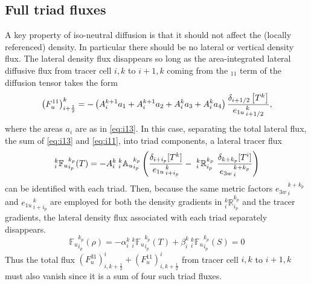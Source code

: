 \documentclass[../tex_main/NEMO_manual]{subfiles}
\begin{document}
\subsection{Full triad fluxes}
A key property of iso-neutral diffusion is that it should not affect
the (locally referenced) density. In particular there should be no
lateral or vertical density flux. The lateral density flux disappears so long as the
area-integrated lateral diffusive flux from tracer cell $i,k$ to
$i+1,k$ coming from the $_{11}$ term of the diffusion tensor takes the
form
\begin{equation}
  \label{eq:i11}
  \left( F_u^{11} \right) _{i+\frac{1}{2}} ^{k} =
  - \left( {A}_i^{k+1} a_{1} + {A}_i^{k+1} a_{2} + {A}_i^k
    a_{3} + {A}_i^k a_{4} \right)
  \frac{\delta _{i+1/2} \left[ T^k\right]}{{e_{1u}}_{\,i+1/2}^{\,k}},
\end{equation}
where the areas $a_i$ are as in \autoref{eq:i13}. In this case,
separating the total lateral flux, the sum of \autoref{eq:i13} and
\autoref{eq:i11}, into triad components, a lateral tracer
flux
\begin{equation}
  \label{eq:latflux-triad}
  _i^k {\mathbb{F}_u}_{i_p}^{k_p} (T) = - {A}_i^k{ \:}_i^k{\mathbb{A}_u}_{i_p}^{k_p}
  \left(
    \frac{ \delta_{i+ i_p}[T^k] }{ {e_{1u}}_{\,i + i_p}^{\,k} }
    -\ {_i^k\mathbb{R}_{i_p}^{k_p}} \
    \frac{ \delta_{k+k_p} [T^i] }{{e_{3w}}_{\,i}^{\,k+k_p} }
  \right)
\end{equation}
can be identified with each triad. Then, because the
same metric factors ${e_{3w}}_{\,i}^{\,k+k_p}$ and
${e_{1u}}_{\,i+i_p}^{\,k}$ are employed for both the density gradients
in $ _i^k \mathbb{R}_{i_p}^{k_p}$ and the tracer gradients, the lateral
density flux associated with each triad separately disappears.
\begin{equation}
  \label{eq:latflux-rho}
  {\mathbb{F}_u}_{i_p}^{k_p} (\rho)=-\alpha _i^k {\:}_i^k {\mathbb{F}_u}_{i_p}^{k_p} (T) + \beta_i^k {\:}_i^k {\mathbb{F}_u}_{i_p}^{k_p} (S)=0
\end{equation}
Thus the total flux $\left( F_u^{31} \right) ^i _{i,k+\frac{1}{2}} +
\left( F_u^{11} \right) ^i _{i,k+\frac{1}{2}}$ from tracer cell $i,k$
to $i+1,k$ must also vanish since it is a sum of four such triad fluxes.
\end{document}
